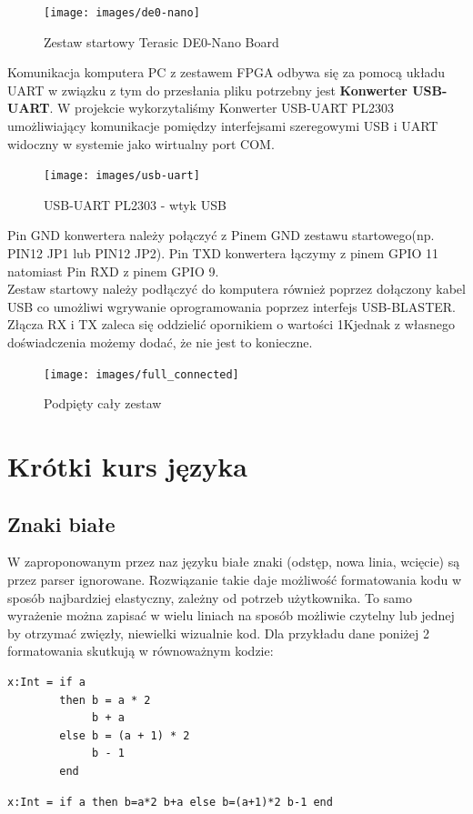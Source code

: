 \begin{figure}[h]
\begin{center}
\texttt{[image: images/de0-nano]}
\caption{Zestaw startowy Terasic DE0-Nano Board}
\end{center}
\end{figure}

Komunikacja komputera PC z zestawem FPGA odbywa się za pomocą układu UART w związku z tym do przesłania pliku potrzebny jest \textbf{Konwerter USB-UART}. W projekcie wykorzytaliśmy Konwerter USB-UART PL2303 umożliwiający komunikacje pomiędzy interfejsami szeregowymi USB i UART widoczny w systemie jako wirtualny port COM.
\begin{figure}[!ht]
\centering
\texttt{[image: images/usb-uart]}
\caption{USB-UART PL2303 - wtyk USB}
\end{figure}
Pin GND konwertera należy połączyć z Pinem GND zestawu startowego(np. PIN12 JP1 lub PIN12 JP2). Pin TXD konwertera łączymy z pinem GPIO 11 natomiast Pin RXD z pinem GPIO 9.\\
Zestaw startowy należy podłączyć do komputera również poprzez dołączony kabel USB co umożliwi wgrywanie oprogramowania poprzez interfejs USB-BLASTER. Złącza RX i TX zaleca się oddzielić opornikiem o wartości 1K\ohm\space jednak z własnego doświadczenia możemy dodać, że nie jest to konieczne.
\begin{figure}[!ht]
\centering
\texttt{[image: images/full\_connected]}
\caption{Podpięty cały zestaw}
\end{figure}
\section{Krótki kurs języka}
\subsection{Znaki białe}
W zaproponowanym przez naz języku białe znaki (odstęp, nowa linia, wcięcie) są przez parser ignorowane.
Rozwiązanie takie daje możliwość formatowania kodu w sposób najbardziej elastyczny, zależny od potrzeb użytkownika. To samo wyrażenie można zapisać w wielu liniach na sposób możliwie czytelny lub jednej by otrzymać zwięzły, niewielki wizualnie kod.
Dla przykładu dane poniżej 2 formatowania skutkują w równoważnym kodzie:
\begin{lstlisting}[frame=single]
x:Int = if a
        then b = a * 2
             b + a
        else b = (a + 1) * 2
             b - 1
        end
\end{lstlisting}
\begin{lstlisting}[frame=single]
x:Int = if a then b=a*2 b+a else b=(a+1)*2 b-1 end
\end{lstlisting}

